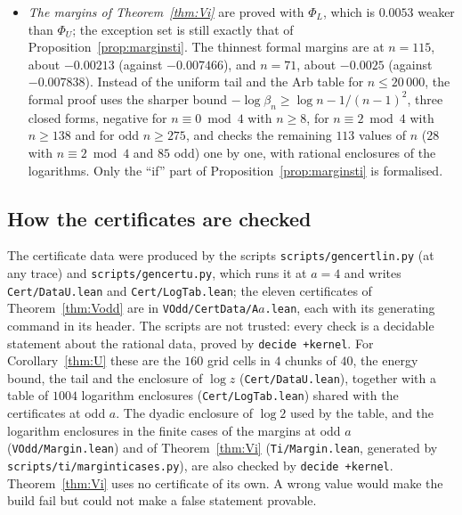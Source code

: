 \documentclass[11pt]{amsart}
\theoremstyle{definition}
\theoremstyle{remark}
\numberwithin{equation}{section}
\newcommand{\lean}[1]{{\def\_{\textunderscore\allowbreak}\texttt{#1}}}
\begin{document}
\begin{itemize}
  moves the formal certificate of Corollary~\ref{thm:U} to $\beta_n$, so the formal analytic constant is
  $\Phi_L-\frac12L_i(n)+\delta$ for any $\delta>0$. No further certificate is needed.
\item \emph{The margins of Theorem~\ref{thm:Vi}} are proved with $\Phi_L$, which is $0.0053$ weaker than $\Phi_U$; the
  exception set is still exactly that of Proposition~\ref{prop:marginsti}. The thinnest formal margins are at $n=115$,
  about $-0.00213$ (against $-0.007466$), and $n=71$, about $-0.0025$ (against $-0.007838$). Instead of the uniform tail
  and the Arb table for $n\le20\,000$, the formal proof uses the sharper bound $-\log\beta_n\ge\log n-1/(n-1)^2$, three
  closed forms, negative for $n\equiv0\bmod4$ with $n\ge8$, for $n\equiv2\bmod4$ with $n\ge138$ and for odd $n\ge275$,
  and checks the remaining $113$ values of $n$ ($28$ with $n\equiv2\bmod4$ and $85$ odd) one by one, with rational
  enclosures of the logarithms. Only the ``if'' part of Proposition~\ref{prop:marginsti} is formalised.
\end{itemize}

\subsection{How the certificates are checked}
The certificate data were produced by the scripts \lean{scripts\slash{}gen\_cert\_lin.py} (at any trace) and
\lean{scripts\slash{}gen\_cert\_u.py}, which runs it at $a=4$ and writes \lean{Cert\slash{}DataU.lean} and
\lean{Cert\slash{}LogTab.lean}; the eleven certificates of Theorem~\ref{thm:Vodd} are in
\lean{VOdd\slash{}CertData\slash{}A$a$.lean}, each with its generating command in its header. The scripts are not
trusted: every check is a decidable statement about the rational data, proved by \lean{decide +kernel}. For
Corollary~\ref{thm:U} these are the $160$ grid cells in $4$ chunks of $40$, the energy bound, the tail and the enclosure
of $\log z$ (\lean{Cert\slash{}DataU.lean}), together with a table of $1004$ logarithm enclosures
(\lean{Cert\slash{}LogTab.lean}) shared with the certificates at odd $a$. The dyadic enclosure of $\log2$ used by the
table, and the logarithm enclosures in the finite cases of the margins at odd $a$ (\lean{VOdd\slash{}Margin.lean}) and
of Theorem~\ref{thm:Vi} (\lean{Ti\slash{}Margin.lean}, generated by \lean{scripts\slash{}ti\slash{}margin\_ti\_cases.py}),
are also checked by \lean{decide +kernel}. Theorem~\ref{thm:Vi} uses no certificate of its own. A wrong value would make the build fail but
could not make a false statement provable.
\end{document}
